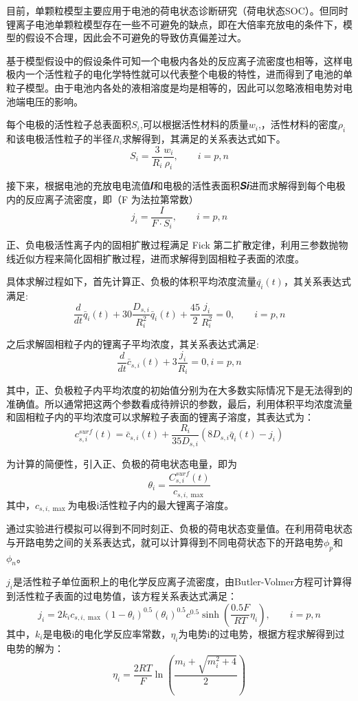 \documentclass[12pt]{ctexart}%
\begin{document}
目前，单颗粒模型主要应用于电池的荷电状态诊断研究（荷电状态SOC）。但同时锂离子电池单颗粒模型存在一些不可避免的缺点，即在大倍率充放电的条件下，模型的假设不合理，因此会不可避免的导致仿真偏差过大。

基于模型假设中的假设条件可知一个电极内各处的反应离子流密度也相等，这样电极内一个活性粒子的电化学特性就可以代表整个电极的特性\cite{santhanagopalan2006review}，进而得到了电池的单粒子模型。由于电池内各处的液相溶度是均是相等的，因此可以忽略液相电势对电池端电压的影响。

每个电极的活性粒子总表面积$S_{i}$,可以根据活性材料的质量$w_i$,，活性材料的密度$\rho_{i}$和该电极活性粒子的半径$R_i$求解得到，其满足的关系表达式如下。
$$S_{i}=\frac{3}{R_{i}} \frac{w_{i}}{\rho_{i}}, \qquad i=p, n$$

接下来，根据电池的充放电电流值𝑰和电极的活性表面积𝑺𝒊进而求解得到每个电极内的反应离子流密度，即（F 为法拉第常数）
$$j_{i}=\frac{I}{F \cdot S_{i}}, \qquad i=p, n$$

正、负电极活性离子内的固相扩散过程满足 Fick 第二扩散定律，利用三参数抛物线近似方程来简化固相扩散过程，进而求解得到固相粒子表面的浓度。

具体求解过程如下，首先计算正、负极的体积平均浓度流量$\bar{q_i}(t)$，其关系表达式满足:
$$\frac{d}{d t} \bar{q}_{i}(t)+30 \frac{D_{s, i}}{R_{i}^{2}} \bar{q}_{i}(t)+\frac{45}{2} \frac{j_{i}}{R_{i}^{2}}=0, \qquad i=p, n$$

之后求解固相粒子内的锂离子平均浓度，其关系表达式满足:
$$\frac{d}{d t} \bar{c}_{s, i}(t)+3 \frac{j_{i}}{R_{i}}=0, i=p, n$$

其中，正、负极粒子内平均浓度的初始值分别为在大多数实际情况下是无法得到的准确值。所以通常把这两个参数看成待辨识的参数，最后，利用体积平均浓度流量和固相粒子内的平均浓度可以求解粒子表面的锂离子溶度，其表达式为：
$$c_{s, i}^{s u r f}(t)=\bar{c}_{s, i}(t)+\frac{R_{i}}{35 D_{s, i}}\left(8 D_{s, i} \bar{q}_{i}(t)-j_{i}\right)$$

为计算的简便性，引入正、负极的荷电状态电量，即为
$$\theta_{i}=\frac{C_{s, i}^{s u r f}(t)}{c_{s, i, \max }}$$
其中，$c_{s,i,\max}$为电极i活性粒子内的最大锂离子溶度。

通过实验进行模拟可以得到不同时刻正、负极的荷电状态变量值。在利用荷电状态与开路电势之间的关系表达式，就可以计算得到不同电荷状态下的开路电势$\phi_p$和$\phi_n$。

$j_i$是活性粒子单位面积上的电化学反应离子流密度，由Butler-Volmer方程可计算得到活性粒子表面的过电势值，该方程关系表达式满足：
$$j_{i}=2 k_{i} c_{s, i, \max }\left(1-\theta_{i}\right)^{0.5}\left(\theta_{i}\right)^{0.5} c^{0.5} \sinh \left(\frac{0.5 F}{R T} \eta_{i}\right),\qquad i=p, n$$
其中，$k_i$是电极i的电化学反应率常数，$\eta_{i}$为电势i的过电势，根据方程求解得到过电势的解为：
$$\eta_{i}=\frac{2 R T}{F} \ln \left(\frac{m_{i}+\sqrt{m_{i}^{2}+4}}{2}\right)$$
\end{document}
